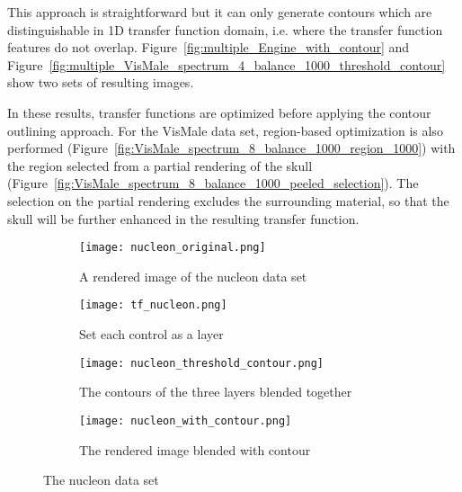This approach is straightforward but it can only generate contours which are distinguishable in 1D transfer function domain, i.e. where the transfer function features do not overlap.
Figure~\ref{fig:multiple_Engine_with_contour} and Figure~\ref{fig:multiple_VisMale_spectrum_4_balance_1000_threshold_contour} show two sets of resulting images.

In these results, transfer functions are optimized before applying the contour outlining approach. For the VisMale data set, region-based optimization is also performed (Figure~\ref{fig:VisMale_spectrum_8_balance_1000_region_1000}) with the region selected from a partial rendering of the skull (Figure~\ref{fig:VisMale_spectrum_8_balance_1000_peeled_selection}). The selection on the partial rendering excludes the surrounding material, so that the skull will be further enhanced in the resulting transfer function.

\begin{figure}
	\centering
	\begin{subfigure}[b]{0.25\textwidth}
		\centering
		\texttt{[image: nucleon\_original.png]}
		\caption{A rendered image of the nucleon data set}
		\label{fig:nucleon_original}
	\end{subfigure}%
	\begin{subfigure}[b]{0.25\textwidth}
		\centering
		\texttt{[image: tf\_nucleon.png]}
		\caption{Set each control as a layer}
		\label{fig:tf_nucleon_2}
	\end{subfigure}%
	\begin{subfigure}[b]{0.25\textwidth}
		\centering
		\texttt{[image: nucleon\_threshold\_contour.png]}
		\caption{The contours of the three layers blended together}
		\label{fig:nucleon_threshold_contour}
	\end{subfigure}%
	\begin{subfigure}[b]{0.25\textwidth}
		\centering
		\texttt{[image: nucleon\_with\_contour.png]}
		\caption{The rendered image blended with contour}
		\label{fig:nucleon_with_contour}
	\end{subfigure}        
	\caption{The nucleon data set}\label{fig:multiple_nucleon_with_contour}
\end{figure}


